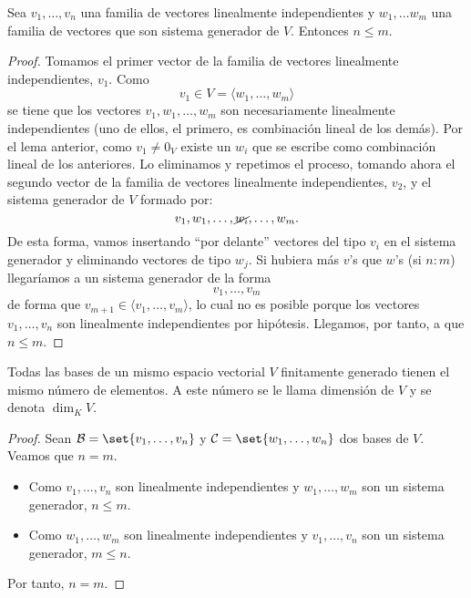 \begin{proposition}
	\label{nm}
	Sea \(v_1, \ldots, v_n \) una familia de vectores linealmente independientes y \(w_1, \ldots w_m \) una familia de vectores que son sistema generador de \(V \). Entonces \(n \leq m \).
\end{proposition}
\begin{proof}
	Tomamos el primer vector de la familia de vectores linealmente independientes, \(v_1 \). Como
	\[
		v_1 \in V = \langle w_1, \ldots, w_m \rangle
	\]
	se tiene que los vectores \(v_1, w_1, \ldots, w_m \) son necesariamente linealmente independientes (uno de ellos, el primero, es combinación lineal de los demás). Por el lema anterior, como \(v_1 \neq 0_V \) existe un \(w_i \) que se escribe como combinación lineal de los anteriores. Lo eliminamos y repetimos el proceso, tomando ahora el segundo vector de la familia de vectores linealmente independientes, \(v_2\), y el sistema generador de \(V \) formado por:
	\[
		v_1, w_1, \ldots, \cancel {w_i}, \ldots, w_m.
	\]
	De esta forma, vamos insertando ``por delante'' vectores del tipo \(v_i \) en el sistema generador y eliminando vectores de tipo \(w_j \). Si hubiera más \(v \)'s que \(w \)'s (si \(n : m \)) llegaríamos a un sistema generador de la forma
	\[
		v_1, \ldots, v_m
	\]
	de forma que \(v_{m+1} \in  \langle v_1, \ldots, v_m \rangle\), lo cual no es posible porque los vectores \(v_1, \ldots, v_n \) son linealmente independientes por hipótesis. Llegamos, por tanto, a que \(n \leq  m\).
\end{proof}
\begin{theorem}
	Todas las bases de un mismo espacio vectorial \(V \) finitamente generado tienen el mismo número de elementos. A este número se le llama dimensión de \(V \) y se denota \(\dim_K V \).
\end{theorem}
\begin{proof}
	Sean \(\mathcal{\MakeUppercase{b}} = \set{v_1, \ldots, v_n }\) y \(\mathcal{\MakeUppercase{c}} = \set{w_1, \ldots, w_n }\) dos bases de \(V \). Veamos que \(n = m \).
	\begin{itemize}
		\item Como \(v_1, \ldots, v_n \) son linealmente independientes y \(w_1, \ldots, w_m\) son un sistema generador, \(n \leq m \).
		\item Como \(w_1,\ldots,w_m \) son linealmente independientes y \(v_1, \ldots, v_n \) son un sistema generador, \(m \leq  n\).
	\end{itemize}
	Por tanto, \(n = m \).
\end{proof}
